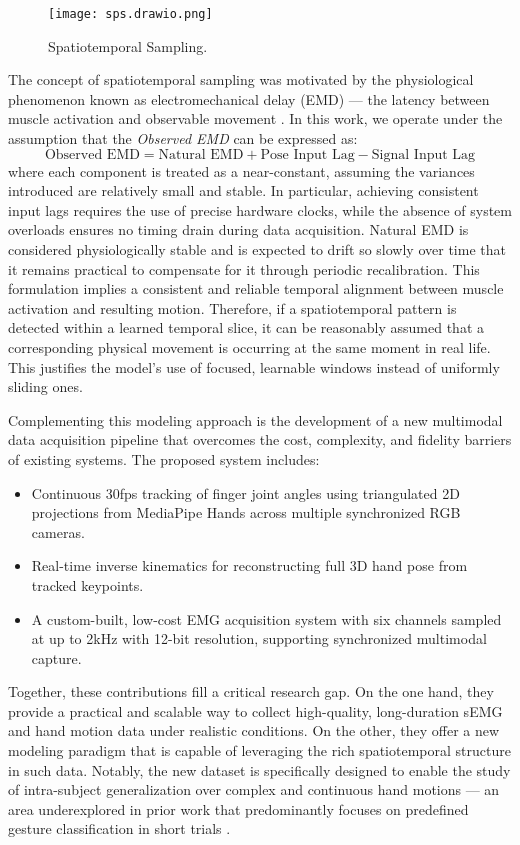 \begin{figure}[H]
    \centering
    \texttt{[image: sps.drawio.png]}
    \caption{Spatiotemporal Sampling.}
    \label{fig:sps}
\end{figure}

The concept of spatiotemporal sampling was motivated by the physiological phenomenon known as electromechanical delay (EMD) — the latency between muscle activation and observable movement \cite{ngeo2014continuous}. In this work, we operate under the assumption that the \textit{Observed EMD} can be expressed as:
\[
\text{Observed EMD} = \text{Natural EMD} + \text{Pose Input Lag} - \text{Signal Input Lag}
\]
where each component is treated as a near-constant, assuming the variances introduced are relatively small and stable. In particular, achieving consistent input lags requires the use of precise hardware clocks, while the absence of system overloads ensures no timing drain during data acquisition. Natural EMD is considered physiologically stable and is expected to drift so slowly over time that it remains practical to compensate for it through periodic recalibration. This formulation implies a consistent and reliable temporal alignment between muscle activation and resulting motion. Therefore, if a spatiotemporal pattern is detected within a learned temporal slice, it can be reasonably assumed that a corresponding physical movement is occurring at the same moment in real life. This justifies the model's use of focused, learnable windows instead of uniformly sliding ones.

Complementing this modeling approach is the development of a new multimodal data acquisition pipeline that overcomes the cost, complexity, and fidelity barriers of existing systems. The proposed system includes:
\begin{itemize}
    \item Continuous 30fps tracking of finger joint angles using triangulated 2D projections from MediaPipe Hands across multiple synchronized RGB cameras.
    \item Real-time inverse kinematics for reconstructing full 3D hand pose from tracked keypoints.
    \item A custom-built, low-cost EMG acquisition system with six channels sampled at up to 2kHz with 12-bit resolution, supporting synchronized multimodal capture.
\end{itemize}

Together, these contributions fill a critical research gap. On the one hand, they provide a practical and scalable way to collect high-quality, long-duration sEMG and hand motion data under realistic conditions. On the other, they offer a new modeling paradigm that is capable of leveraging the rich spatiotemporal structure in such data. Notably, the new dataset is specifically designed to enable the study of intra-subject generalization over complex and continuous hand motions — an area underexplored in prior work that predominantly focuses on predefined gesture classification in short trials \cite{salter2024emg2pose}.

